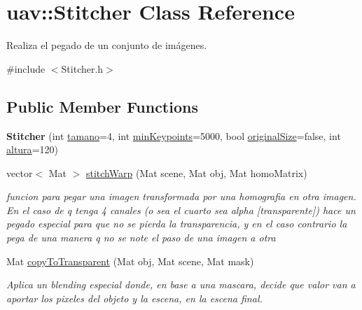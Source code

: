 \hypertarget{classuav_1_1Stitcher}{}\section{uav\+:\+:Stitcher Class Reference}
\label{classuav_1_1Stitcher}


Realiza el pegado de un conjunto de imágenes.  




{\ttfamily \#include $<$Stitcher.\+h$>$}

\subsection*{Public Member Functions}
\begin{DoxyCompactItemize}
\item 
\mbox{\label{classuav_1_1Stitcher_af5f3ef6450e3f54b1c62d53df26a75fd}} 
{\bfseries Stitcher} (int \mbox{\hyperlink{classuav_1_1Stitcher_aecfe8592eb3d8445c0f3e8b722558acb}{tamano}}=4, int \mbox{\hyperlink{classuav_1_1Stitcher_a3b54e9be9bda44c4a04b14a645bd9521}{min\+Keypoints}}=5000, bool \mbox{\hyperlink{classuav_1_1Stitcher_a222f8247abb4fafba61d86078d8f9c16}{original\+Size}}=false, int \mbox{\hyperlink{classuav_1_1Stitcher_a4dc4cd0546fef7f43b85d9079ea09f86}{altura}}=120)
\item 
vector$<$ Mat $>$ \mbox{\hyperlink{classuav_1_1Stitcher_a096e8020a5544325400743836c8ba58d}{stitch\+Warp}} (Mat scene, Mat obj, Mat homo\+Matrix)
\begin{DoxyCompactList}\small\item\em funcion para pegar una imagen transformada por una homografia en otra imagen. En el caso de q tenga 4 canales (o sea el cuarto sea alpha \mbox{[}transparente\mbox{]}) hace un pegado especial para que no se pierda la transparencia, y en el caso contrario la pega de una manera q no se note el paso de una imagen a otra \end{DoxyCompactList}\item 
Mat \mbox{\hyperlink{classuav_1_1Stitcher_a16bfb7a49f1e3a9c38ef03d72969094d}{copy\+To\+Transparent}} (Mat obj, Mat scene, Mat mask)
\begin{DoxyCompactList}\small\item\em Aplica un blending especial donde, en base a una mascara, decide que valor van a aportar los pixeles del objeto y la escena, en la escena final. \end{DoxyCompactList}\item 

\end{DoxyCompactItemize}
